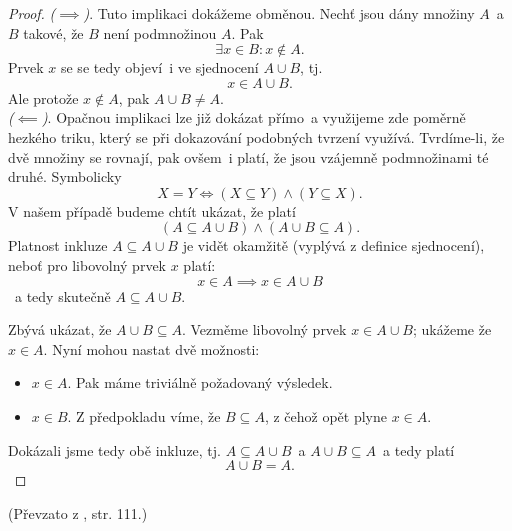 \begin{proof}
    \textit{($\implies$)}. Tuto implikaci dokážeme obměnou. Nechť jsou dány množiny $A$~a $B$ takové, že $B$ není podmnožinou $A$. Pak
    \begin{equation*}
        \exists x\in B : x\notin A.
    \end{equation*}
    Prvek $x$ se se tedy objeví~i ve sjednocení $A \cup B$, tj.
    \begin{equation*}
        x\in A \cup B.
    \end{equation*}
    Ale protože $x\notin A$, pak $A \cup B \neq A$.\\
    \textit{($\impliedby$)}. Opačnou implikaci lze již dokázat přímo~a využijeme zde poměrně hezkého triku, který se při dokazování podobných tvrzení využívá. Tvrdíme-li, že dvě množiny se rovnají, pak ovšem~i platí, že jsou vzájemně podmnožinami té druhé. Symbolicky
    \begin{equation*}
        X = Y \iff (X \subseteq Y) \land (Y \subseteq X).
    \end{equation*}
    V našem případě budeme chtít ukázat, že platí
    \begin{equation*}
        (A \subseteq A \cup B) \land (A \cup B \subseteq A).
    \end{equation*}
    Platnost inkluze $A \subseteq A \cup B$ je vidět okamžitě (vyplývá z definice sjednocení), neboť pro libovolný prvek $x$ platí:
    \begin{equation*}
        x \in A \implies x \in A \cup B
    \end{equation*}
   ~a tedy skutečně $A \subseteq A \cup B$.\par
    Zbývá ukázat, že $A \cup B \subseteq A$. Vezměme libovolný prvek $x \in A \cup B$; ukážeme že $x\in A$. Nyní mohou nastat dvě možnosti:
    \begin{itemize}
        \item $x \in A$. Pak máme triviálně požadovaný výsledek.
        \item $x \in B$. Z předpokladu víme, že $B \subseteq A$, z čehož opět plyne $x\in A$.
    \end{itemize}
    Dokázali jsme tedy obě inkluze, tj. $A \subseteq A \cup B$~a $A \cup B \subseteq A$~a tedy platí
    \begin{equation*}
        A \cup B = A.
    \end{equation*}
\end{proof}
(Převzato z \cite{ChartrandPolimeniZhang2014}, str. 111.)
